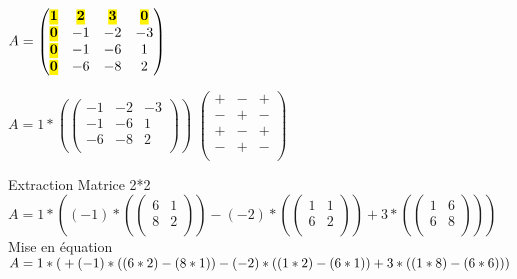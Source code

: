 \vspace{5mm} %

$
A =
\begin{pmatrix}
  \hl{\textbf{1}} & \hl{\textbf{2}} & \hl{\textbf{3}} & \hl{\textbf{0}}   \\
  \hl{\textbf{0}} & -1 & -2 & -3   \\
  \hl{\textbf{0}} & -1 & -6 & 1 \\
  \hl{\textbf{0}} & -6 & -8 & 2 \\
\end{pmatrix}
$

\vspace{5mm} %

$
A = 1*(
  \begin{pmatrix}
    -1 & -2 & -3 \\
    -1 & -6 & 1  \\
    -6 & -8 & 2  \\
  \end{pmatrix})
$
$
  \begin{pmatrix}
    + & - & +  \\
    - & + & -  \\
    + & - & +  \\
    - & + & -  \\
  \end{pmatrix}
$

\vspace{5mm} %

Extraction Matrice 2*2 \\

$
A =
1*(
  (-1)*(
  \begin{pmatrix}
    6 & 1 \\
    8 & 2 \\
  \end{pmatrix})
  -(-2)*(
  \begin{pmatrix}
    1 & 1 \\
    6 & 2 \\
  \end{pmatrix})
  +3*(
  \begin{pmatrix}
    1 & 6 \\
    6 & 8 \\
  \end{pmatrix}
  )
)
$ \\

Mise en équation \\

$
A =
1*( \\
  +(-1)*( (6*2)-(8*1) )  \\
  -(-2)*( (1*2)-(6*1) ) \\
  +3*( (1*8)-(6*6) )  \\
) \\
$

